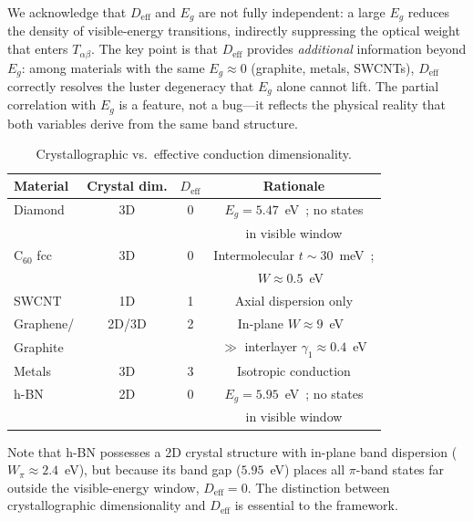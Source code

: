 \documentclass[twocolumn,showpacs,preprintnumbers,amsmath,amssymb,prb]{revtex4-2}
\begin{document}
We acknowledge that $D_\mathrm{eff}$ and $E_g$ are not fully
independent: a large $E_g$ reduces the density of visible-energy
transitions, indirectly suppressing the optical weight that enters
$T_{\alpha\beta}$. The key point is that $D_\mathrm{eff}$ provides
\emph{additional} information beyond $E_g$: among materials with the
same $E_g \approx 0$ (graphite, metals, SWCNTs), $D_\mathrm{eff}$
correctly resolves the luster degeneracy that $E_g$ alone cannot lift.
The partial correlation with $E_g$ is a feature, not a bug---it
reflects the physical reality that both variables derive from the
same band structure.

\begin{table}[h]
\caption{Crystallographic vs.\ effective conduction dimensionality.}
\label{tab:Deff}
\begin{ruledtabular}
\begin{tabular}{lccc}
  Material & Crystal dim. & $D_\mathrm{eff}$ & Rationale \\
  \hline
  Diamond      & 3D     & 0 & $E_g = 5.47$~eV~\cite{Clark1964}; no states \\
               &        &   & in visible window \\
  C$_{60}$ fcc & 3D     & 0 & Intermolecular $t \sim 30$~meV~\cite{Hebard1991}; \\
               &        &   & $W \approx 0.5$~eV~\cite{Gunnarsson1997} \\
  SWCNT        & 1D     & 1 & Axial dispersion only \\
  Graphene/    & 2D/3D  & 2 & In-plane $W \approx 9$~eV~\cite{Reich2002} \\
  \quad Graphite &      &   & $\gg$ interlayer $\gamma_1 \approx 0.4$~eV \\
  Metals       & 3D     & 3 & Isotropic conduction \\
  h-BN         & 2D     & 0 & $E_g = 5.95$~eV~\cite{Cassabois2016}; no states \\
               &        &   & in visible window \\
\end{tabular}
\end{ruledtabular}
\end{table}

Note that h-BN possesses a 2D crystal structure with in-plane band
dispersion ($W_\pi \approx 2.4$~eV), but because its band gap
($5.95$~eV) places all $\pi$-band states far outside the visible-energy
window, $D_\mathrm{eff} = 0$. The distinction between crystallographic
dimensionality and $D_\mathrm{eff}$ is essential to the framework.
\end{document}

